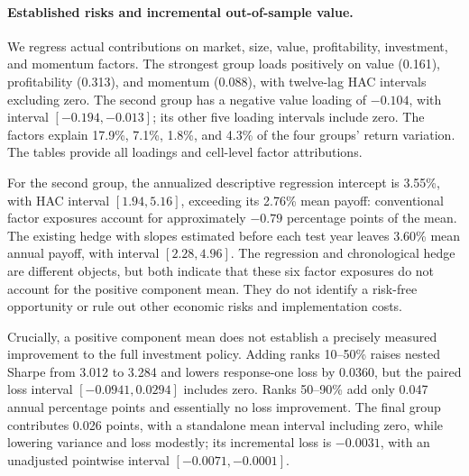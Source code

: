 
\paragraph{Established risks and incremental out-of-sample value.}
We regress actual contributions on market, size, value, profitability, investment, and momentum factors. The strongest group loads positively on value (0.161), profitability (0.313), and momentum (0.088), with twelve-lag HAC intervals excluding zero. The second group has a negative value loading of $-0.104$, with interval $[-0.194,-0.013]$; its other five loading intervals include zero. The factors explain 17.9\%, 7.1\%, 1.8\%, and 4.3\% of the four groups' return variation. The tables provide all loadings and cell-level factor attributions.

For the second group, the annualized descriptive regression intercept is 3.55\%, with HAC interval $[1.94,5.16]$, exceeding its 2.76\% mean payoff: conventional factor exposures account for approximately $-0.79$ percentage points of the mean. The existing hedge with slopes estimated before each test year leaves 3.60\% mean annual payoff, with interval $[2.28,4.96]$. The regression and chronological hedge are different objects, but both indicate that these six factor exposures do not account for the positive component mean. They do not identify a risk-free opportunity or rule out other economic risks and implementation costs.

Crucially, a positive component mean does not establish a precisely measured improvement to the full investment policy. Adding ranks 10--50\% raises nested Sharpe from 3.012 to 3.284 and lowers response-one loss by 0.0360, but the paired loss interval $[-0.0941,0.0294]$ includes zero. Ranks 50--90\% add only 0.047 annual percentage points and essentially no loss improvement. The final group contributes 0.026 points, with a standalone mean interval including zero, while lowering variance and loss modestly; its incremental loss is $-0.0031$, with an unadjusted pointwise interval $[-0.0071,-0.0001]$.

